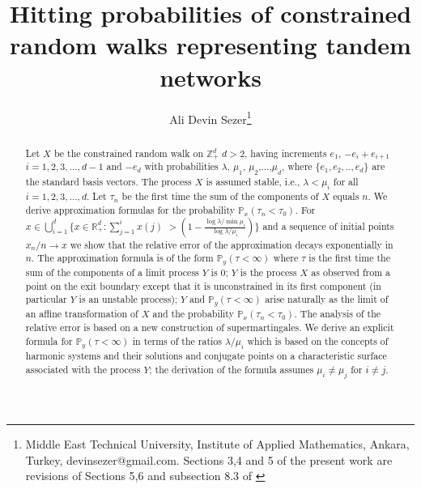 \documentclass[11pt,a4paper]{article}
\begin{document}
\title{Hitting probabilities of constrained random walks representing tandem networks}
\author{Ali Devin Sezer\footnote{Middle East Technical University, Institute of Applied Mathematics, Ankara, Turkey, devinsezer@gmail.com.
Sections 3,4 and 5 of the present work are revisions of Sections 5,6 and subsection 8.3 of \cite{sezer2015exit}}}
\maketitle
\begin{abstract}
Let $X$ be the constrained random walk on $\mathbb{Z}_+^d$ $d >2$, having increments $e_1$, $-e_i+e_{i+1}$ $i=1,2,3,...,d-1$ and $-e_d$ with probabilities $\lambda$, $\mu_1$, $\mu_2$,...,$\mu_d$, where $\{e_1,e_2,..,e_d\}$ are the standard basis vectors.  The process $X$ is assumed stable, i.e., $\lambda < \mu_i$ for all $i=1,2,3,...,d.$ Let $\tau_n$ be the first time the sum of the components of $X$ equals $n$. We derive approximation formulas for the probability ${\mathbb P}_x(\tau_n < \tau_0)$.  For $x \in  \bigcup_{i=1}^d \Big\{x \in {\mathbb R}^d_+: \sum_{j=1}^{i} x(j)$ $>  \left(1 - \frac{\log \lambda/\min \mu_i}{\log \lambda/\mu_i}\right) \Big\}$ and a sequence of initial points $x_n/n \rightarrow x$ we show that the relative error of the approximation decays exponentially in $n$.  The approximation formula is of the form ${\mathbb P}_y(\tau < \infty)$ where $\tau$ is the first time the sum of the components of a limit process $Y$ is $0$; $Y$ is the process $X$ as observed from a point on the exit boundary except that it is unconstrained in its first component (in particular $Y$ is an unstable process); $Y$ and ${\mathbb P}_y(\tau< \infty)$ arise naturally as the limit of an affine transformation of $X$ and the probability ${\mathbb P}_x(\tau_n < \tau_0).$ The analysis of the relative error is based on a new construction of supermartingales. We derive an explicit formula for ${\mathbb P}_y(\tau < \infty)$ in terms of the ratios $\lambda/\mu_i$ which is based on the concepts of harmonic systems and their solutions and conjugate points on a characteristic surface associated with the process $Y$; the derivation of the formula assumes $\mu_i \neq \mu_j$ for $i\neq j.$
\end{abstract}
\end{document}
